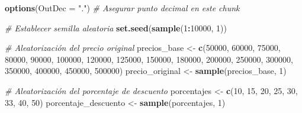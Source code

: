 \documentclass[
]{article}
\author{}
\date{\vspace{-2.5em}}
\newenvironment{Shaded}{\begin{snugshade}}{\end{snugshade}}
\newcommand{\AttributeTok}[1]{\textcolor[rgb]{0.13,0.29,0.53}{#1}}
\newcommand{\CommentTok}[1]{\textcolor[rgb]{0.56,0.35,0.01}{\textit{#1}}}
\newcommand{\DecValTok}[1]{\textcolor[rgb]{0.00,0.00,0.81}{#1}}
\newcommand{\FunctionTok}[1]{\textcolor[rgb]{0.13,0.29,0.53}{\textbf{#1}}}
\newcommand{\NormalTok}[1]{#1}
\newcommand{\OtherTok}[1]{\textcolor[rgb]{0.56,0.35,0.01}{#1}}
\newcommand{\SpecialCharTok}[1]{\textcolor[rgb]{0.81,0.36,0.00}{\textbf{#1}}}
\newcommand{\StringTok}[1]{\textcolor[rgb]{0.31,0.60,0.02}{#1}}
\begin{document}
\begin{Shaded}
\begin{Highlighting}[]
\FunctionTok{options}\NormalTok{(}\AttributeTok{OutDec =} \StringTok{"."}\NormalTok{)  }\CommentTok{\# Asegurar punto decimal en este chunk}

\CommentTok{\# Establecer semilla aleatoria}
\FunctionTok{set.seed}\NormalTok{(}\FunctionTok{sample}\NormalTok{(}\DecValTok{1}\SpecialCharTok{:}\DecValTok{10000}\NormalTok{, }\DecValTok{1}\NormalTok{))}

\CommentTok{\# Aleatorización del precio original}
\NormalTok{precios\_base }\OtherTok{\textless{}{-}} \FunctionTok{c}\NormalTok{(}\DecValTok{50000}\NormalTok{, }\DecValTok{60000}\NormalTok{, }\DecValTok{75000}\NormalTok{, }\DecValTok{80000}\NormalTok{, }\DecValTok{90000}\NormalTok{, }\DecValTok{100000}\NormalTok{, }\DecValTok{120000}\NormalTok{, }\DecValTok{125000}\NormalTok{,}
                 \DecValTok{150000}\NormalTok{, }\DecValTok{180000}\NormalTok{, }\DecValTok{200000}\NormalTok{, }\DecValTok{250000}\NormalTok{, }\DecValTok{300000}\NormalTok{, }\DecValTok{350000}\NormalTok{, }\DecValTok{400000}\NormalTok{, }\DecValTok{450000}\NormalTok{, }\DecValTok{500000}\NormalTok{)}
\NormalTok{precio\_original }\OtherTok{\textless{}{-}} \FunctionTok{sample}\NormalTok{(precios\_base, }\DecValTok{1}\NormalTok{)}

\CommentTok{\# Aleatorización del porcentaje de descuento}
\NormalTok{porcentajes }\OtherTok{\textless{}{-}} \FunctionTok{c}\NormalTok{(}\DecValTok{10}\NormalTok{, }\DecValTok{15}\NormalTok{, }\DecValTok{20}\NormalTok{, }\DecValTok{25}\NormalTok{, }\DecValTok{30}\NormalTok{, }\DecValTok{33}\NormalTok{, }\DecValTok{40}\NormalTok{, }\DecValTok{50}\NormalTok{)}
\NormalTok{porcentaje\_descuento }\OtherTok{\textless{}{-}} \FunctionTok{sample}\NormalTok{(porcentajes, }\DecValTok{1}\NormalTok{)}


\end{Highlighting}
\end{Shaded}
\end{document}
